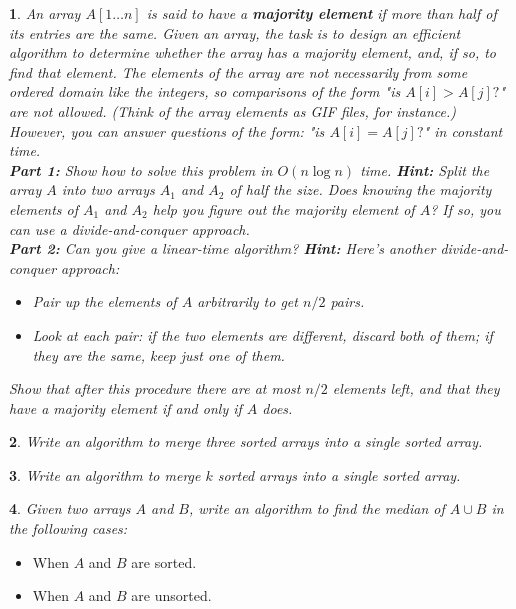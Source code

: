 \documentclass[%
addpoints]{exam}
\theoremstyle{problem}
\newtheorem{p}{}
\begin{document}
\begin{p}
An array \( A[1 \dots n] \) is said to have a \textbf{majority element} if more than half of its entries are the same. Given an array, the task is to design an efficient algorithm to determine whether the array has a majority element, and, if so, to find that element. The elements of the array are not necessarily from some ordered domain like the integers, so comparisons of the form "is \( A[i] > A[j]? \)" are not allowed. (Think of the array elements as GIF files, for instance.) However, you can answer questions of the form: "is \( A[i] = A[j]? \)" in constant time.\\
\vspace{10pt}
\textbf{Part 1:} Show how to solve this problem in \( O(n \log n) \) time. 
\textbf{Hint:} Split the array \( A \) into two arrays \( A_1 \) and \( A_2 \) of half the size. Does knowing the majority elements of \( A_1 \) and \( A_2 \) help you figure out the majority element of \( A \)? If so, you can use a \textit{divide-and-conquer} approach.\\
\vspace{10pt}
\textbf{Part 2:} Can you give a linear-time algorithm? 
\textbf{Hint:} Here's another \textit{divide-and-conquer} approach:
\begin{itemize}
    \item Pair up the elements of \( A \) arbitrarily to get \( n/2 \) pairs.
    \item Look at each pair: if the two elements are different, discard both of them; if they are the same, keep just one of them.
\end{itemize}
Show that after this procedure there are at most \( n/2 \) elements left, and that they have a majority element if and only if \( A \) does.
\hfill \end{p}

\begin{p}
Write an algorithm to merge three sorted arrays into a single sorted array.\\
\hfill \end{p}

\begin{p}
Write an algorithm to merge \( k \) sorted arrays into a single sorted array.\\
\hfill \end{p}

\begin{p}
Given two arrays \( A \) and \( B \), write an algorithm to find the median of \( A \cup B \) in the following cases:  
\hfill \end{p}
\begin{itemize}
    \item When \( A \) and \( B \) are sorted.
    \item When \( A \) and \( B \) are unsorted.
\end{itemize}
\end{document}
